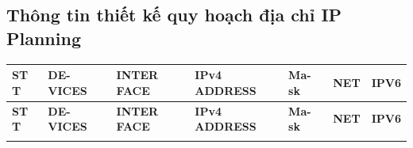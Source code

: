 \documentclass[12pt,a4paper]{report}
\begin{document}
\subsection{Thông tin thiết kế quy hoạch địa chỉ IP Planning}
\begin{center}
    \def\arraystretch{2.1}\begin{longtable}{|p{}|p{}|p{}|p{}|p{}|p{}|p{}|}
    
    
    \hline \textbf{ST T} &\textbf{DE- VICES} & \textbf{INTER FACE} &  \textbf{IPv4 ADDRESS} &  \textbf{Ma- sk} &\textbf{NET} & \textbf{IPV6}\\ \hline 
    
    \endfirsthead
    
    
    
    \hline \textbf{ST T} &\textbf{DE- VICES} & \textbf{INTER FACE} &  \textbf{IPv4 ADDRESS} &  \textbf{Ma- sk} &\textbf{NET} & \textbf{IPV6}\\ \hline 
    
    \endhead
    
       
    \endfoot
    

\end{longtable}
\end{center}
\end{document}
